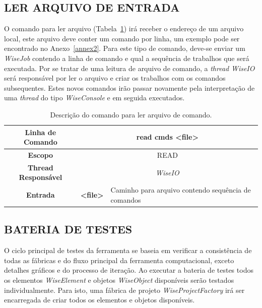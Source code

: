 \subsection{LER ARQUIVO DE ENTRADA}\label{sec:read_cmds}


O comando para ler arquivo (Tabela~\ref{tab:read}) irá receber o endereço de um arquivo local, este arquivo deve conter um comando por linha, um exemplo pode ser encontrado no Anexo~\ref{annex2}. Para este tipo de comando, deve-se enviar um \textit{WiseJob} contendo a linha de comando e qual a sequência de trabalhos que será executada. Por se tratar de uma leitura de arquivo de comando, a \textit{thread} \textit{WiseIO} será responsável por ler o arquivo e criar os trabalhos com os comandos subsequentes. Estes novos comandos irão passar novamente pela interpretação de uma \textit{thread} do tipo \textit{WiseConsole} e em seguida executados.

\begin{center}
	\begin{table}[!htbp]
		\begin{tabularx}{\textwidth}{c|c|X}
			\toprule
			\textbf{Linha de Comando} & \multicolumn{2}{c}{read cmds <file>} \\
			\midrule
			\textbf{Escopo} & \multicolumn{2}{c}{READ} \\
			\hline
			\textbf{Thread Responsável} & \multicolumn{2}{c}{\textit{WiseIO}} \\
			\hline
			\textbf{Entrada} & \textbf{<file>} & Caminho para arquivo contendo sequência de comandos \\
			\bottomrule
		\end{tabularx}
		\caption{Descrição do comando para ler arquivo de comando.}
		\label{tab:read}
	\end{table}
\end{center}

\subsection{BATERIA DE TESTES}\label{sec:test}

O ciclo principal de testes da ferramenta se baseia em verificar a consistência de todas as fábricas e do fluxo principal da ferramenta computacional, exceto detalhes gráficos e do processo de iteração. Ao executar a bateria de testes todos os elementos \textit{WiseElement} e objetos \textit{WiseObject} disponíveis serão testados individualmente. Para isto, uma fábrica de projeto \textit{WiseProjectFactory} irá ser encarregada de criar todos os elementos e objetos disponíveis.

